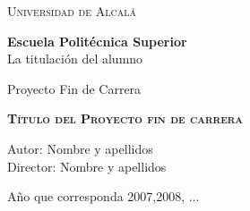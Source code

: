 \setcounter{page}{0}

\begin{center}
\LARGE \textsc{Universidad de Alcalá}\\
\vspace{0.5cm}

\textbf{Escuela Politécnica Superior}\\

La titulación del alumno\\
\end{center}

\vspace{0.5cm}


\begin{center}
\end{center}


\begin{center}
\vspace{1cm}

\LARGE Proyecto Fin de Carrera\\

\vspace{0.5cm}

\textbf{\Huge \textsc{{Título del Proyecto fin de carrera}}}\\

\vspace{1.5cm}

\large Autor: Nombre y apellidos\\
Director: Nombre y apellidos\\

\vspace{1.5cm}

\large Año que corresponda 2007,2008, ...\\
\end{center}


